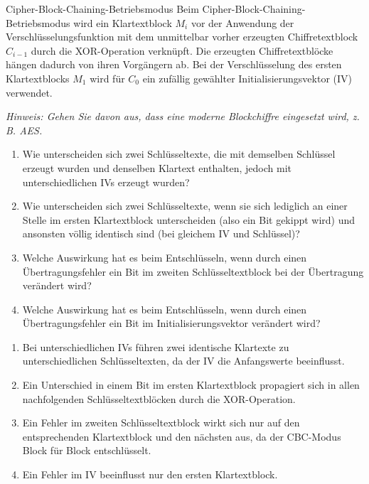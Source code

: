 \documentclass{article}
\begin{document}
\begin{exercise}{Cipher-Block-Chaining-Betriebsmodus}
  Beim Cipher-Block-Chaining-Betriebsmodus wird ein Klartextblock $M_i$ vor der Anwendung der Verschlüsselungsfunktion mit dem unmittelbar vorher erzeugten Chiffretextblock $C_{i-1}$ durch die XOR-Operation verknüpft.
  Die erzeugten Chiffretextblöcke hängen dadurch von ihren Vorgängern ab. Bei der Verschlüsselung des ersten Klartextblocks $M_1$ wird für $C_0$ ein zufällig gewählter Initialisierungsvektor (IV) verwendet.
    \par\textit{Hinweis: Gehen Sie davon aus, dass eine moderne Blockchiffre eingesetzt wird, z. B. AES.}
  \begin{enumerate}
    \item Wie unterscheiden sich zwei Schlüsseltexte, die mit demselben Schlüssel erzeugt wurden und denselben Klartext enthalten, jedoch mit unterschiedlichen IVs erzeugt wurden?
    \item Wie unterscheiden sich zwei Schlüsseltexte, wenn sie sich lediglich an einer Stelle im ersten Klartextblock unterscheiden (also ein Bit gekippt wird) und ansonsten völlig identisch sind (bei gleichem IV und Schlüssel)?
    \item Welche Auswirkung hat es beim Entschlüsseln, wenn durch einen Übertragungsfehler ein Bit im zweiten Schlüsseltextblock bei der Übertragung verändert wird?
    \item Welche Auswirkung hat es beim Entschlüsseln, wenn durch einen Übertragungsfehler ein Bit im Initialisierungsvektor verändert wird?
  \end{enumerate}

  \begin{solution}
    \begin{enumerate}
        \item Bei unterschiedlichen IVs führen zwei identische Klartexte zu unterschiedlichen Schlüsseltexten, da der IV die Anfangswerte beeinflusst.
        \item Ein Unterschied in einem Bit im ersten Klartextblock propagiert sich in allen nachfolgenden Schlüsseltextblöcken durch die XOR-Operation.
        \item Ein Fehler im zweiten Schlüsseltextblock wirkt sich nur auf den entsprechenden Klartextblock und den nächsten aus, da der CBC-Modus Block für Block entschlüsselt.
        \item Ein Fehler im IV beeinflusst nur den ersten Klartextblock.
    \end{enumerate}
  \end{solution}
\end{exercise}
\end{document}

